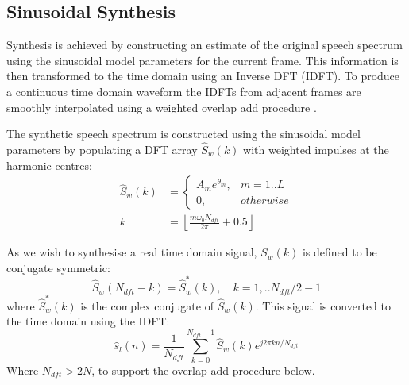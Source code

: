 \documentclass{article}
\begin{document}
\subsection{Sinusoidal Synthesis}

Synthesis is achieved by constructing an estimate of the original speech spectrum using the sinusoidal model parameters for the current frame. This information is then transformed to the time domain using an Inverse DFT (IDFT). To produce a continuous time domain waveform the IDFTs from adjacent frames are smoothly interpolated using a weighted overlap add procedure \cite{mcaulay1986speech}.

The synthetic speech spectrum is constructed using the sinusoidal model parameters by populating a DFT array $\hat{S}_w(k)$ with weighted impulses at the harmonic centres:
\begin{equation}
\begin{split}
\hat{S}_w(k) &= \begin{cases}
                A_m e^{\theta_m}, & m=1..L \\
                0, & otherwise
                \end{cases} \\
k &= \left \lfloor \frac{m \omega_0 N_{dft}}{2 \pi} + 0.5 \right \rfloor
\end{split}
\end{equation}

As we wish to synthesise a real time domain signal, $S_w(k)$ is defined to be conjugate symmetric:
\begin{equation}
\hat{S}_w(N_{dft}-k) = \hat{S}_w^{*}(k), \quad k = 1,.. N_{dft}/2-1
\end{equation}
where $\hat{S}_w^*(k)$ is the complex conjugate of $\hat{S}_w(k)$. This signal is converted to the time domain
using the IDFT:
\begin{equation}
\label{eq:synth_idft}
\hat{s}_l(n) = \frac{1}{N_{dft}}\sum_{k=0}^{N_{dft}-1} \hat{S}_w(k) e^{j 2 \pi k n / N_{dft}}
\end{equation}
Where $N_{dft} > 2N$, to support the overlap add procedure below.
\end{document}
